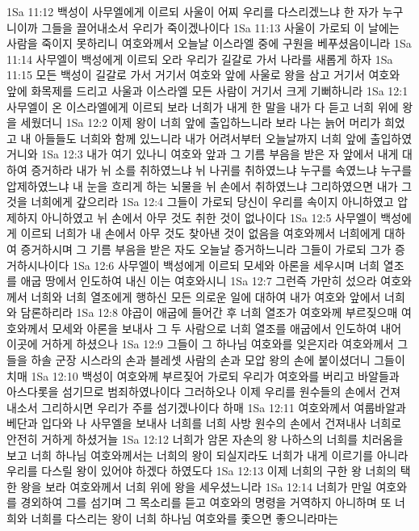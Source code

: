 1Sa 11:12  백성이 사무엘에게 이르되 사울이 어찌 우리를 다스리겠느냐 한 자가 누구니이까 그들을 끌어내소서 우리가 죽이겠나이다
1Sa 11:13  사울이 가로되 이 날에는 사람을 죽이지 못하리니 여호와께서 오늘날 이스라엘 중에 구원을 베푸셨음이니라
1Sa 11:14  사무엘이 백성에게 이르되 오라 우리가 길갈로 가서 나라를 새롭게 하자
1Sa 11:15  모든 백성이 길갈로 가서 거기서 여호와 앞에 사울로 왕을 삼고 거기서 여호와 앞에 화목제를 드리고 사울과 이스라엘 모든 사람이 거기서 크게 기뻐하니라
1Sa 12:1  사무엘이 온 이스라엘에게 이르되 보라 너희가 내게 한 말을 내가 다 듣고 너희 위에 왕을 세웠더니
1Sa 12:2  이제 왕이 너희 앞에 출입하느니라 보라 나는 늙어 머리가 희었고 내 아들들도 너희와 함께 있느니라 내가 어려서부터 오늘날까지 너희 앞에 출입하였거니와
1Sa 12:3  내가 여기 있나니 여호와 앞과 그 기름 부음을 받은 자 앞에서 내게 대하여 증거하라 내가 뉘 소를 취하였느냐 뉘 나귀를 취하였느냐 누구를 속였느냐 누구를 압제하였느냐 내 눈을 흐리게 하는 뇌물을 뉘 손에서 취하였느냐 그리하였으면 내가 그것을 너희에게 갚으리라
1Sa 12:4  그들이 가로되 당신이 우리를 속이지 아니하였고 압제하지 아니하였고 뉘 손에서 아무 것도 취한 것이 없나이다
1Sa 12:5  사무엘이 백성에게 이르되 너희가 내 손에서 아무 것도 찾아낸 것이 없음을 여호와께서 너희에게 대하여 증거하시며 그 기름 부음을 받은 자도 오늘날 증거하느니라 그들이 가로되 그가 증거하시나이다
1Sa 12:6  사무엘이 백성에게 이르되 모세와 아론을 세우시며 너희 열조를 애굽 땅에서 인도하여 내신 이는 여호와시니
1Sa 12:7  그런즉 가만히 섰으라 여호와께서 너희와 너희 열조에게 행하신 모든 의로운 일에 대하여 내가 여호와 앞에서 너희와 담론하리라
1Sa 12:8  야곱이 애굽에 들어간 후 너희 열조가 여호와께 부르짖으매 여호와께서 모세와 아론을 보내사 그 두 사람으로 너희 열조를 애굽에서 인도하여 내어 이곳에 거하게 하셨으나
1Sa 12:9  그들이 그 하나님 여호와를 잊은지라 여호와께서 그들을 하솔 군장 시스라의 손과 블레셋 사람의 손과 모압 왕의 손에 붙이셨더니 그들이 치매
1Sa 12:10  백성이 여호와께 부르짖어 가로되 우리가 여호와를 버리고 바알들과 아스다롯을 섬기므로 범죄하였나이다 그러하오나 이제 우리를 원수들의 손에서 건져 내소서 그리하시면 우리가 주를 섬기겠나이다 하매
1Sa 12:11  여호와께서 여룹바알과 베단과 입다와 나 사무엘을 보내사 너희를 너희 사방 원수의 손에서 건져내사 너희로 안전히 거하게 하셨거늘
1Sa 12:12  너희가 암몬 자손의 왕 나하스의 너희를 치러옴을 보고 너희 하나님 여호와께서는 너희의 왕이 되실지라도 너희가 내게 이르기를 아니라 우리를 다스릴 왕이 있어야 하겠다 하였도다
1Sa 12:13  이제 너희의 구한 왕 너희의 택한 왕을 보라 여호와께서 너희 위에 왕을 세우셨느니라
1Sa 12:14  너희가 만일 여호와를 경외하여 그를 섬기며 그 목소리를 듣고 여호와의 명령을 거역하지 아니하며 또 너희와 너희를 다스리는 왕이 너희 하나님 여호와를 좇으면 좋으니라마는
